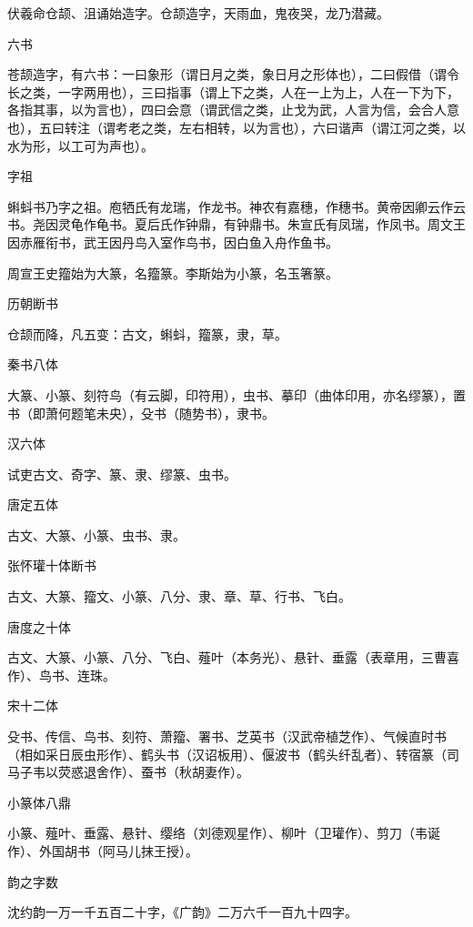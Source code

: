 \documentclass[a4paper,12pt,UTF8,twoside]{ctexbook}
\begin{document}
    伏羲命仓颉、沮诵始造字。仓颉造字，天雨血，鬼夜哭，龙乃潜藏。
    
    六书
    
    苍颉造字，有六书：一曰象形（谓日月之类，象日月之形体也），二曰假借（谓令长之类，一字两用也），三曰指事（谓上下之类，人在一上为上，人在一下为下，各指其事，以为言也），四曰会意（谓武信之类，止戈为武，人言为信，会合人意也），五曰转注（谓考老之类，左右相转，以为言也），六曰谐声（谓江河之类，以水为形，以工可为声也）。
    
    字祖
    
    蝌蚪书乃字之祖。庖牺氏有龙瑞，作龙书。神农有嘉穗，作穗书。黄帝因卿云作云书。尧因灵龟作龟书。夏后氏作钟鼎，有钟鼎书。朱宣氏有凤瑞，作凤书。周文王因赤雁衔书，武王因丹鸟入室作鸟书，因白鱼入舟作鱼书。
    
    周宣王史籀始为大篆，名籀篆。李斯始为小篆，名玉箸篆。
    
    历朝断书
    
    仓颉而降，凡五变：古文，蝌蚪，籀篆，隶，草。
    
    秦书八体
    
    大篆、小篆、刻符鸟（有云脚，印符用），虫书、摹印（曲体印用，亦名缪篆），置书（即萧何题笔未央），殳书（随势书），隶书。
    
    汉六体
    
    试吏古文、奇字、篆、隶、缪篆、虫书。
    
    唐定五体
    
    古文、大篆、小篆、虫书、隶。
    
    张怀瓘十体断书
    
    古文、大篆、籀文、小篆、八分、隶、章、草、行书、飞白。
    
    唐度之十体
    
    古文、大篆、小篆、八分、飞白、薤叶（本务光）、悬针、垂露（表章用，三曹喜作）、鸟书、连珠。
    
    宋十二体
    
    殳书、传信、鸟书、刻符、萧籀、署书、芝英书（汉武帝植芝作）、气候直时书（相如采日辰虫形作）、鹤头书（汉诏板用）、偃波书（鹤头纤乱者）、转宿篆（司马子韦以荧惑退舍作）、蚕书（秋胡妻作）。
    
    小篆体八鼎
    
    小篆、薤叶、垂露、悬针、缨络（刘德观星作）、柳叶（卫瓘作）、剪刀（韦诞作）、外国胡书（阿马儿抹王授）。
    
    韵之字数
    
    沈约韵一万一千五百二十字，《广韵》二万六千一百九十四字。
    
\end{document}
